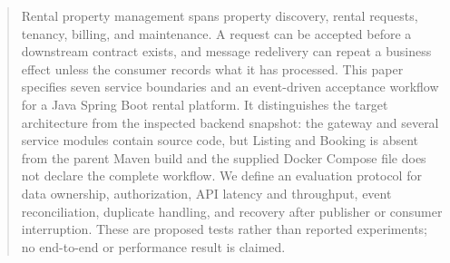 \begin{abstract}
Rental property management spans property discovery, rental requests, tenancy, billing, and maintenance. A request can be accepted before a downstream contract exists, and message redelivery can repeat a business effect unless the consumer records what it has processed. This paper specifies seven service boundaries and an event-driven acceptance workflow for a Java Spring Boot rental platform. It distinguishes the target architecture from the inspected backend snapshot: the gateway and several service modules contain source code, but Listing and Booking is absent from the parent Maven build and the supplied Docker Compose file does not declare the complete workflow. We define an evaluation protocol for data ownership, authorization, API latency and throughput, event reconciliation, duplicate handling, and recovery after publisher or consumer interruption. These are proposed tests rather than reported experiments; no end-to-end or performance result is claimed.
\end{abstract}

